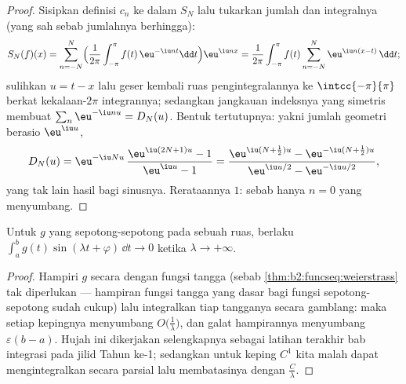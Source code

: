 \begin{proof}
Sisipkan definisi $c_n$ ke dalam $S_N$ lalu tukarkan jumlah dan integralnya
(yang sah sebab jumlahnya berhingga):
\[
S_N(f)(x)
= \sum_{n=-N}^{N}\Bigl(\frac{1}{2\pi}\int_{-\pi}^{\pi}
f(t)\,\eu^{-\iu nt}\dd t\Bigr)\eu^{\iu nx}
= \frac{1}{2\pi}\int_{-\pi}^{\pi} f(t)
\sum_{n=-N}^{N}\eu^{\iu n(x-t)}\,\dd t ;
\]
sulihkan $u = t - x$ lalu geser kembali ruas pengintegralannya
ke $\intcc{-\pi}{\pi}$ berkat kekalaan-$2\pi$ integrannya;
sedangkan jangkauan indeksnya yang simetris membuat $\sum_n\eu^{-\iu nu} = D_N(u)$.
Bentuk tertutupnya: yakni jumlah geometri berasio $\eu^{\iu u}$,
\[
D_N(u) = \eu^{-\iu Nu}\,\frac{\eu^{\iu(2N+1)u} - 1}{\eu^{\iu u} -
1}
= \frac{\eu^{\iu(N + \frac12)u} - \eu^{-\iu(N+\frac12)u}}
{\eu^{\iu u/2} - \eu^{-\iu u/2}} ,
\]
yang tak lain hasil bagi sinusnya. Rerataannya $1$: sebab hanya $n = 0$
yang menyumbang.
\end{proof}

\begin{theorem}\label{thm:b2:fourier:riemannlebesgue}
Untuk $g$ yang  sepotong-sepotong pada sebuah ruas, berlaku
$\int_a^b g(t)\sin(\lambda t + \varphi)\,\dd t \to 0$ ketika $\lambda
\to +\infty$.
\end{theorem}

\begin{proof}
Hampiri $g$ secara  dengan fungsi tangga
(sebab \cref{thm:b2:funcseq:weierstrass} tak diperlukan --- hampiran
fungsi tangga yang dasar bagi fungsi  sepotong-sepotong
sudah cukup) lalu integralkan tiap tangganya secara gamblang: maka setiap
kepingnya menyumbang $O\bigl(\frac1\lambda\bigr)$, dan galat
hampirannya menyumbang $\varepsilon(b - a)$. Hujah ini dikerjakan
selengkapnya sebagai latihan terakhir bab integrasi pada jilid
Tahun ke-1; sedangkan untuk keping $C^1$ kita malah dapat mengintegralkan
secara parsial lalu membatasinya dengan $\frac C\lambda$.
\end{proof}

